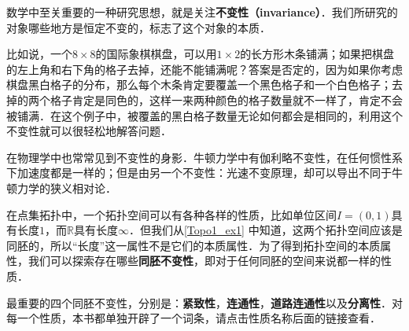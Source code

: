 数学中至关重要的一种研究思想，就是关注\textbf{不变性（invariance）}．我们所研究的对象哪些地方是恒定不变的，标志了这个对象的本质．

比如说，一个$8\times8$的国际象棋棋盘，可以用$1\times2$的长方形木条铺满；如果把棋盘的左上角和右下角的格子去掉，还能不能铺满呢？答案是否定的，因为如果你考虑棋盘黑白格子的分布，那么每个木条肯定要覆盖一个黑色格子和一个白色格子；去掉的两个格子肯定是同色的，这样一来两种颜色的格子数量就不一样了，肯定不会被铺满．在这个例子中，被覆盖的黑白格子数量无论如何都会是相同的，利用这个不变性就可以很轻松地解答问题．

在物理学中也常常见到不变性的身影．牛顿力学中有伽利略不变性，在任何惯性系下加速度都是一样的；但是由另一个不变性：光速不变原理，却可以导出不同于牛顿力学的狭义相对论．

在点集拓扑中，一个拓扑空间可以有各种各样的性质，比如单位区间$I=(0,1)$具有长度$1$，而$\mathbb{R}$具有长度$\infty$．但我们从\autoref{Topo1_ex1} 中知道，这两个拓扑空间应该是同胚的，所以“长度”这一属性不是它们的本质属性．为了得到拓扑空间的本质属性，我们可以探索存在哪些\textbf{同胚不变性}，即对于任何同胚的空间来说都一样的性质．

最重要的四个同胚不变性，分别是：\textbf{紧致性}，\textbf{连通性}，\textbf{道路连通性}以及\textbf{分离性}．对每一个性质，本书都单独开辟了一个词条，请点击性质名称后面的链接查看．
